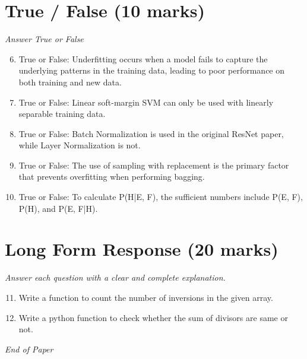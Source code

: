 \documentclass[12pt]{article}
\begin{document}
\section*{True / False (10 marks)}
\textit{Answer True or False}
\begin{enumerate}[label=\arabic*.]
\setcounter{enumi}{5}
\item True or False: Underfitting occurs when a model fails to capture the underlying patterns in the training data, leading to poor performance on both training and new data.
\item True or False: Linear soft-margin SVM can only be used with linearly separable training data.
\item True or False: Batch Normalization is used in the original ResNet paper, while Layer Normalization is not.
\item True or False: The use of sampling with replacement is the primary factor that prevents overfitting when performing bagging.
\item True or False: To calculate P(H|E, F), the sufficient numbers include P(E, F), P(H), and P(E, F|H).
\end{enumerate}

\section*{Long Form Response (20 marks)}
\textit{Answer each question with a clear and complete explanation.}
\begin{enumerate}[label=\arabic*.]
\setcounter{enumi}{10}
\item Write a function to count the number of inversions in the given array.
\item Write a python function to check whether the sum of divisors are same or not.
\end{enumerate}

\vfill
\noindent\textit{End of Paper}
\end{document}
